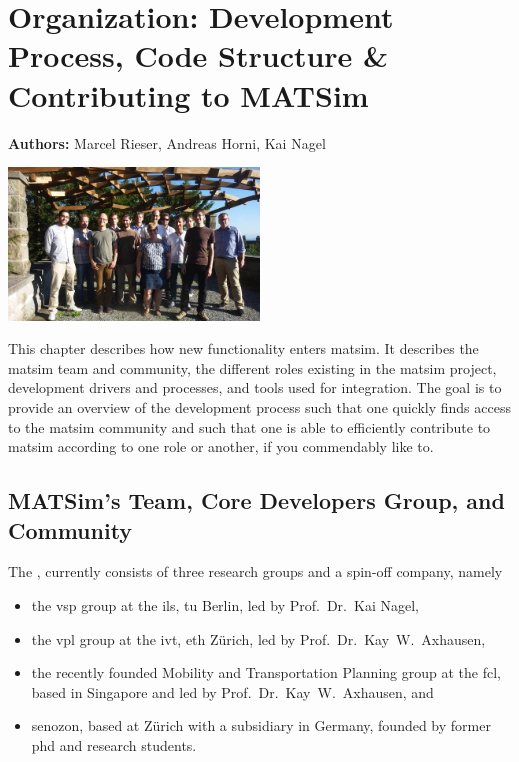 \chapter{Organization: Development Process, Code Structure \& Contributing to MATSim}
\label{ch:developmentprocess}

\hfill \textbf{Authors:} Marcel Rieser, Andreas Horni, Kai Nagel

\begin{center} \includegraphics[width=0.5\textwidth, angle=0]{extending/figures/ConceptualMeetingVillaHatt.png} \end{center}

This chapter describes how new functionality enters \gls{matsim}. It describes the \gls{matsim} team and community, the different roles existing in the \gls{matsim} project, development drivers and processes, and tools used for integration. The goal is to 
provide an overview of the development process such that 
one quickly finds access to the \gls{matsim} community and such that 
one is able to efficiently contribute to \gls{matsim} according to one role or another, if you commendably like to.

\section{MATSim's Team, Core Developers Group, and Community}
The , 
currently consists of three research groups and a spin-off company, namely 
\begin{itemize}\styleItemize
\item the \gls{vsp} group at the \gls{ils}, \gls{tu} Berlin, led by Prof.~Dr.~Kai Nagel,
\item the \gls{vpl} group at the \gls{ivt}, \gls{eth} Zürich, led by Prof.~Dr.~Kay~W.~Axhausen, 
\item the recently founded Mobility and Transportation Planning group at the \gls{fcl}, based in Singapore and led by Prof.~Dr.~Kay~W.~Axhausen, and 
\item \gls{senozon}, based at Zürich with a subsidiary in Germany, founded by former \acrshort{phd} and research students. 
\end{itemize}

